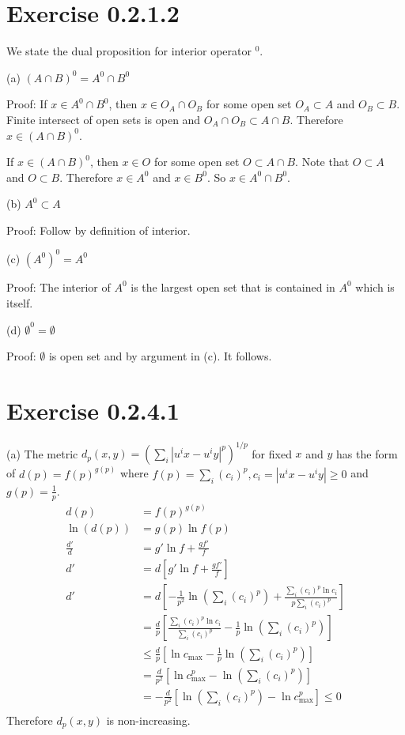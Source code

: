 \documentclass[12pt]{article}
\begin{document}
\section*{Exercise 0.2.1.2}
We state the dual proposition for interior operator $^0$. 

(a) $(A \cap B)^0 = A^0 \cap B^0$

Proof: If $x \in A^0 \cap B^0$,  then $x \in O_A \cap O_B$ for some open set $O_A \subset A$ and $O_B \subset B$. Finite intersect of open sets is open and $O_A \cap O_B \subset A \cap B$. Therefore $x \in (A \cap B)^0$.

If $x \in (A \cap B)^0$, then $x \in O$ for some open set $O \subset A \cap B$. Note that $O \subset A$ and $O \subset B$. Therefore $x \in A^0$ and $x \in B^0$. So $x \in A^0 \cap B^0$. \QED

(b) $A^0 \subset A$

Proof: Follow by definition of interior. \QED

(c) $(A^0)^0 = A^0$

Proof: The interior of $A^0$ is the largest open set that is contained in $A^0$ which is itself. \QED

(d) $\emptyset^0 = \emptyset$

Proof: $\emptyset$ is open set and by argument in (c). It follows. \QED

\section*{Exercise 0.2.4.1}
(a) The metric $d_p(x,y) = \left( \sum_i |u^i x - u^i y|^p \right)^{1/p}$ for fixed $x$ and $y$ has the form of $d(p) = f(p)^{g(p)}$ where $f(p) = \sum_i (c_i)^p,  c_i =  |u^i x - u^i y| \geq 0$ and $g(p) = \frac{1}{p}$. 
$$
\begin{aligned}
	d(p) &= f(p)^{g(p)} \\
	\ln(d(p)) &= g(p) \ln f(p) \\
	\frac{d'}{d} &= g' \ln f + \frac{gf'}{f} \\
	d' &= d \left[g' \ln f + \frac{gf'}{f} \right] \\
	d' &= d  \left[-\frac{1}{p^2} \ln \left(\sum_i (c_i)^p \right) + \frac{\sum_i (c_i)^p \ln c_i}{p \sum_i (c_i)^p} \right]  \\
	&= \frac{d}{p}  \left[\frac{\sum_i (c_i)^p \ln c_i}{\sum_i (c_i)^p} -\frac{1}{p} \ln \left(\sum_i (c_i)^p \right)  \right] \\
	&\leq \frac{d}{p}  \left[\ln c_{\max}-\frac{1}{p} \ln \left(\sum_i (c_i)^p \right)  \right] \\
	&= \frac{d}{p^2}  \left[\ln c_{\max}^p-\ln \left(\sum_i (c_i)^p \right)  \right] \\
	&= - \frac{d}{p^2} \left[\ln\left(\sum_i (c_i)^p\right) - \ln c_{\max}^p \right] \leq 0  \\
\end{aligned}
$$
Therefore $d_p(x,y)$ is non-increasing. \QED
\end{document}

